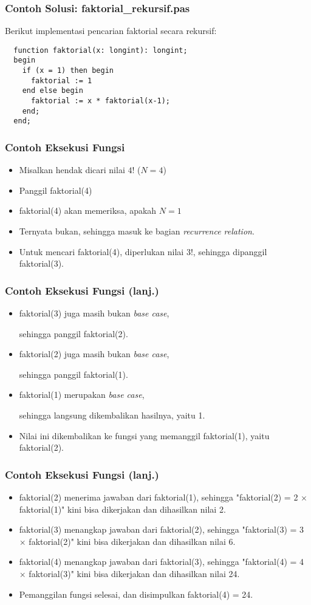 \begin{frame}[fragile]
\frametitle{Contoh Solusi: faktorial\_rekursif.pas}
Berikut implementasi pencarian faktorial secara rekursif:
\begin{lstlisting}
  function faktorial(x: longint): longint;
  begin
    if (x = 1) then begin
      faktorial := 1
    end else begin
      faktorial := x * faktorial(x-1); 
    end;
  end;
\end{lstlisting}
\end{frame}

\begin{frame}
\frametitle{Contoh Eksekusi Fungsi}
\begin{itemize}
  \item Misalkan hendak dicari nilai $4!$ ($N=4$)
  \item Panggil faktorial(4)
  \item faktorial(4) akan memeriksa, apakah $N=1$
  \item Ternyata bukan, sehingga masuk ke bagian \textit{recurrence relation}.
  \item Untuk mencari faktorial(4), diperlukan nilai $3!$, sehingga dipanggil faktorial(3).
\end{itemize}
\end{frame}

\begin{frame}
\frametitle{Contoh Eksekusi Fungsi (lanj.) }
\begin{itemize}
  \item faktorial(3) juga masih bukan \textit{base case},
  
  sehingga panggil faktorial(2).
  \item faktorial(2) juga masih bukan \textit{base case}, 
  
  sehingga panggil faktorial(1).
  \item faktorial(1) merupakan \textit{base case}, 
  
  sehingga langsung dikembalikan hasilnya, yaitu 1.
  
  \item Nilai ini dikembalikan ke fungsi yang memanggil faktorial(1), yaitu faktorial(2).
 
\end{itemize}
\end{frame}

\begin{frame}
\frametitle{Contoh Eksekusi Fungsi (lanj.) }
\begin{itemize}
  \item faktorial(2) menerima jawaban dari faktorial(1), sehingga "faktorial(2) = 2 $\times$ faktorial(1)" kini bisa dikerjakan dan dihasilkan nilai 2.
  \item faktorial(3) menangkap jawaban dari faktorial(2), sehingga "faktorial(3) = 3 $\times$ faktorial(2)" kini bisa dikerjakan dan dihasilkan nilai 6.
  \item faktorial(4) menangkap jawaban dari faktorial(3), sehingga "faktorial(4) = 4 $\times$ faktorial(3)" kini bisa dikerjakan dan dihasilkan nilai 24.
  \item Pemanggilan fungsi selesai, dan disimpulkan faktorial(4) = 24.
\end{itemize}
\end{frame}

